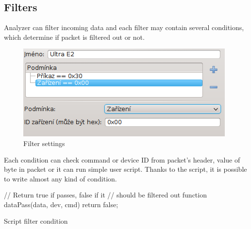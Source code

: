 \documentclass[12pt, a4paper, oneside]{article}
\begin{document}
\subsection{Filters}
Analyzer can filter incoming data and each filter may contain several conditions, which determine if packet is filtered out or not.
\begin{figure}[H]
\begin{center}
\includegraphics[scale=0.9]{img/filters.png}
\caption{Filter settings}
\end{center}
\end{figure}

\setlength{\voffset}{0mm}
\addtolength{\textheight}{-20mm}
\newpage
Each condition can check command or device ID from packet's header, value of byte in packet or  it can run simple user script. Thanks to the script, it is possible to write almost any kind of condition.

\begin{listing}[H]
\begin{jscode}
// Return true if passes, false if it
// should be filtered out
function dataPass(data, dev, cmd) {
    return false;
}
\end{jscode}
\caption{Script filter condition}
\end{listing}

\end{document}

